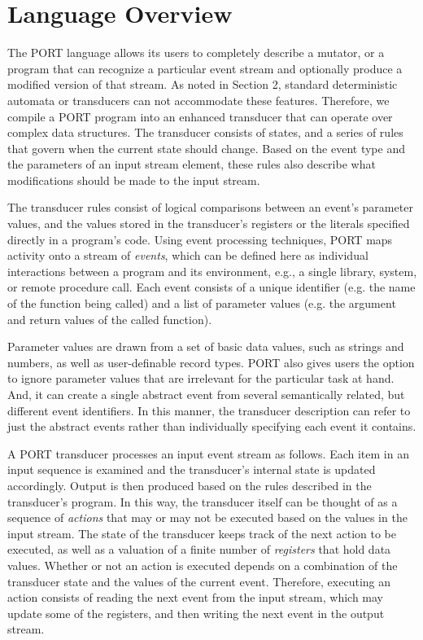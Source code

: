 \section{Language Overview}
\label{sec:Overview}


The PORT language allows its users to completely describe a mutator, or a program that can recognize a particular event stream and optionally produce a modified version of that stream.
As noted in Section 2, standard
deterministic automata or transducers can not accommodate these features.
Therefore, we compile a PORT program into
an  enhanced transducer that can operate over complex data structures.
The transducer consists of states, and
a series of rules that govern when the current state should change. Based on the event type
and the parameters of an input stream element, these rules also describe what modifications should be made to the input stream.

The transducer rules consist of logical comparisons between an event's parameter values, and the values stored in the transducer's registers or the literals specified directly in a program's code.
Using event processing techniques, PORT maps activity onto a
stream of \emph{events}, which can be defined here as individual interactions between a program and its environment, e.g.,
a single library, system, or remote procedure call.
Each event consists of a unique identifier (e.g. the name of the function being called) and a list of parameter values (e.g. the argument and return values of the called function).

Parameter values are drawn from a set of basic data values, such as strings and numbers, as well as user-definable record types. PORT also gives users the option to ignore parameter values that are irrelevant for the particular task at hand. And, it can create a single abstract event from several semantically related, but different event identifiers. In this manner, the transducer description can refer to just the abstract events rather than individually specifying each event it contains.

A PORT transducer processes an input event stream as follows.
Each item in an input
sequence is examined and the transducer's internal state is updated accordingly.
 Output is then produced based on the rules described in the transducer's program.
 In this way, 
 the transducer itself can be thought of as a sequence of \emph{actions}
 that may or may not be executed based on the values in the input stream. 
 The state of the transducer keeps track of the next action to be executed, as well as a valuation of a 
 finite number of \emph{registers} that hold data values.
 Whether or not an action is executed depends on a combination of the transducer state
 and the values of the current event.
 Therefore, executing an action consists of reading the next
event from the input stream, which may update some of the registers, and then writing the next event in the output stream.

